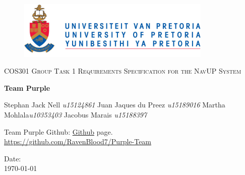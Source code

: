 \begin{titlepage}
	\begin{center}
		\begin{figure}[t]
			\centering
			\includegraphics[width=350px]{logo.PNG}
		\end{figure}
		
		\textsc{\LARGE COS301 Group Task 1 \newline\newline Requirements Specification for the NavUP System}
		
		\textbf{\newline Team Purple} \\
		\begin{flushright} \large
			Stephan Jack Nell \emph{u15124861} \newline
			Juan Jaques du Preez \emph{u15189016} \newline
			Martha Mohlala\emph{u10353403}\newline
			Jacobus Marais \emph{u15188397}\newline
		\end{flushright}

		\vfill %

		Team Purple Github: \href{https://github.com/RavenBlood7/Purple-Team}{Github} page.\\
\url{https://github.com/RavenBlood7/Purple-Team}

		\vfill
{\large Date:}
\\
{\large \today}

	\end{center}
\end{titlepage}
